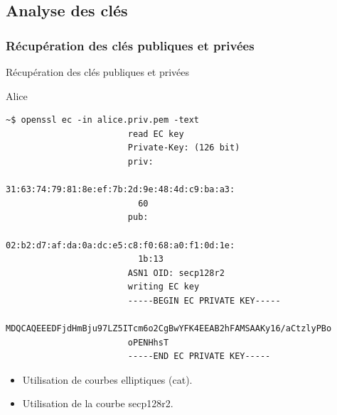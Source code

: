\documentclass[10pt,sans,usenames,dvipsnames,french,compress]{beamer}
\begin{document}
\subsection{Analyse des clés}

\subsubsection{Récupération des clés publiques et privées}
\begin{frame}[fragile]{Récupération des clés publiques et privées}
  \begin{block}{Alice}
    \vspace{-3mm}
    \begin{lstlisting}[style=Term]
                        ~$ openssl ec -in alice.priv.pem -text
                        read EC key
                        Private-Key: (126 bit)
                        priv:
                          31:63:74:79:81:8e:ef:7b:2d:9e:48:4d:c9:ba:a3:
                          60
                        pub:
                          02:b2:d7:af:da:0a:dc:e5:c8:f0:68:a0:f1:0d:1e:
                          1b:13
                        ASN1 OID: secp128r2
                        writing EC key
                        -----BEGIN EC PRIVATE KEY-----
                        MDQCAQEEEDFjdHmBju97LZ5ITcm6o2CgBwYFK4EEAB2hFAMSAAKy16/aCtzlyPBo
                        oPENHhsT
                        -----END EC PRIVATE KEY-----
    \end{lstlisting}
    \vspace{-2mm}
  \end{block}

  \begin{itemize}
      \item <2-> Utilisation de courbes elliptiques (cat).
      \item <3-> Utilisation de la courbe secp128r2.
	\end{itemize}
\end{frame}
\end{document}

